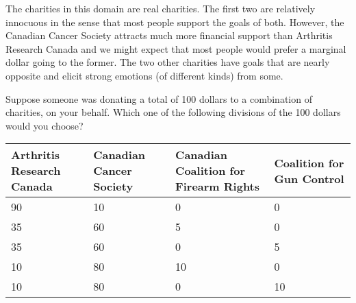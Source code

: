 
The charities in this domain are real charities.
The first two are relatively innocuous in the sense that most people support the goals of both.
However, the Canadian Cancer Society attracts much more financial support than Arthritis Research Canada and we might expect that most people would prefer a marginal dollar going to the former.
The two other charities have goals that are nearly opposite and elicit strong emotions (of different kinds) from some.

\begin{tcolorbox}
Suppose someone was donating a total of 100 dollars to a combination of charities,
on your behalf.
Which one of the following divisions of the 100 dollars would you choose?

\begin{tabular}{p{35mm}|p{35mm}|p{35mm}|p{35mm}}
\hline
Arthritis Research Canada &
Canadian Cancer Society &
Canadian Coalition for Firearm Rights &
Coalition for Gun Control \\
\hline
90 & 10 & 0 & 0 \\
35 & 60 & 5 & 0 \\
35 & 60 & 0 & 5 \\
10 & 80 & 10 & 0 \\
10 & 80 & 0 & 10 \\
\hline
\end{tabular}
\end{tcolorbox}
